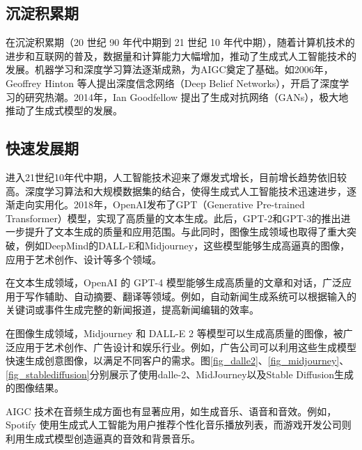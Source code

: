 \documentclass[a4paper]{nuist}
\begin{document}
\subsection{沉淀积累期}

在沉淀积累期（20 世纪 90 年代中期到 21 世纪 10 年代中期），随着计算机技术的进步和互联网的普及，数据量和计算能力大幅增加，推动了生成式人工智能技术的发展。机器学习和深度学习算法逐渐成熟，为AIGC奠定了基础。如2006年，Geoffrey Hinton 等人提出深度信念网络（Deep Belief Networks）\cite{hinton2009deep}，开启了深度学习的研究热潮。2014年，Ian Goodfellow 提出了生成对抗网络（GANs）\cite{goodfellow2020generative}，极大地推动了生成式模型的发展。

\subsection{快速发展期}

进入21世纪10年代中期，人工智能技术迎来了爆发式增长，目前增长趋势依旧较高。深度学习算法和大规模数据集的结合，使得生成式人工智能技术迅速进步，逐渐走向实用化。2018年，OpenAI\cite{OpenAI66:online}发布了GPT（Generative Pre-trained Transformer）模型，实现了高质量的文本生成。此后，GPT-2和GPT-3的推出进一步提升了文本生成的质量和应用范围。与此同时，图像生成领域也取得了重大突破，例如DeepMind的DALL-E\cite{DALLE2O26:online}和Midjourney\cite{Midjourn42:online}，这些模型能够生成高逼真的图像，应用于艺术创作、设计等多个领域。

在文本生成领域，OpenAI 的 GPT-4 模型能够生成高质量的文章和对话，广泛应用于写作辅助、自动摘要、翻译等领域。例如，自动新闻生成系统可以根据输入的关键词或事件生成完整的新闻报道，提高新闻编辑的效率。

在图像生成领域，Midjourney\cite{Midjourn42:online} 和 DALL-E 2\cite{DALLE2O26:online} 等模型可以生成高质量的图像，被广泛应用于艺术创作、广告设计和娱乐行业。例如，广告公司可以利用这些生成模型快速生成创意图像，以满足不同客户的需求。图\ref{fig_dalle2}、\ref{fig_midjourney}、\ref{fig_stablediffusion}分别展示了使用dalle-2\cite{DALLE2O26:online}、MidJourney\cite{Midjourn42:online}以及Stable Diffusion\cite{CompViss98:online}生成的图像结果。

AIGC 技术在音频生成方面也有显著应用，如生成音乐、语音和音效。例如，Spotify\cite{SpotifyW96:online} 使用生成式人工智能为用户推荐个性化音乐播放列表，而游戏开发公司则利用生成式模型创造逼真的音效和背景音乐。
\end{document}
